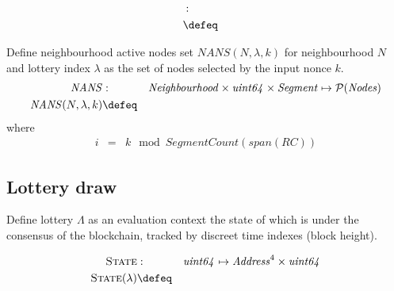 \begin{definition}
\label{def:winner-claim}

\end{definition}

\begin{definition}
\label{def:winner-claim-validity}

\end{definition}


\begin{definition}
\label{def:recent-tickets}
\begin{eqnarray}
\mathit{}&:&\\
\mathit{}&\defeq&
\end{eqnarray}
\end{definition}

\begin{definition}
\label{def:nans}
Define neighbourhood active nodes set $\mathit{NANS}(N,\lambda,k)$
for neighbourhood $N$ and lottery index $\lambda$ as the set of nodes selected by the input nonce $k$.
\begin{eqnarray}
\mathit{NANS}&:&\mathit{Neighbourhood}\times\mathit{uint64}\times\mathit{Segment}\mapsto\mathcal{P}(\mathit{Nodes})\\
\mathit{NANS}(N,\lambda,k)&\defeq&
\end{eqnarray}
where
\begin{eqnarray}
i&=&k \mod \mathit{SegmentCount}(\mathit{span}(\mathit{RC}))
\end{eqnarray}
\end{definition}

\subsection{Lottery draw}  

\begin{definition}
\label{def:lottery-blockchain}
Define lottery $\Lambda$ as an evaluation context the state of which is under the consensus of the blockchain, tracked by discreet time indexes (block height).

\begin{eqnarray}
\textsc{State}&:&\mathit{uint64}\mapsto\mathit{Address}^4\times\mathit{uint64}\\
\textsc{State}(\lambda)&\defeq&
\end{eqnarray}

\end{definition}


